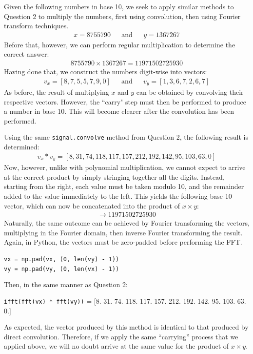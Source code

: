 \documentclass[a4paper, 11pt]{article}
\begin{document}
Given the following numbers in base 10, we seek to apply similar methods to
Question 2 to multiply the numbers, first using convolution, then using Fourier
transform techniques.
\begin{align*}
    x = 8755790 && \text{and} && y = 1367267
\end{align*}
Before that, however, we can perform regular multiplication to determine the
correct answer:
\begin{align*}
    8755790 \times 1367267 = 11971502725930
\end{align*}
Having done that, we construct the numbers digit-wise into vectors:
\begin{align*}
    v_x = [8, 7, 5, 5, 7, 9, 0] && \text{and} && v_y = [1, 3, 6, 7, 2, 6, 7]
\end{align*}
As before, the result of multiplying $x$ and $y$ can be obtained by convolving
their respective vectors. However, the ``carry" step must then be performed to
produce a number in base 10. This will become clearer after the convolution has
been performed.

Using the same \texttt{signal.convolve} method from Question 2, the following
result is determined:
\begin{align*}
    v_x \ast v_y = [8, 31, 74, 118, 117, 157, 212, 192, 142, 95, 103, 63, 0]
\end{align*}
Now, however, unlike with polynomial multiplication, we cannot expect to
arrive at the correct product by simply stringing together all the digits.
Instead, starting from the right, each value must be taken modulo 10, and the
remainder added to the value immediately to the left. This yields the following
base-10 vector, which can now be concatenated into the product of $x \times y$:
\begin{align*}
    [1, 1, 9, 7, 1, 5, 0, 2, 7, 2, 5, 9, 3, 0] \longrightarrow 11971502725930
\end{align*}
Naturally, the same outcome can be achieved by Fourier transforming the vectors,
multiplying in the Fourier domain, then inverse Fourier transforming the result.
Again, in Python, the vectors must be zero-padded before performing the FFT.
\begin{center}
    \texttt{vx = np.pad(vx, (0, len(vy) - 1))} \\
    \texttt{vy = np.pad(vy, (0, len(vx) - 1))}
\end{center}
Then, in the same manner as Question 2:
\begin{center}
    \texttt{ifft(fft(vx) * fft(vy))} =
        [8.  31.  74. 118. 117. 157. 212. 192. 142.  95. 103.  63.   0.]
\end{center}
As expected, the vector produced by this method is identical to that produced by
direct convolution. Therefore, if we apply the same ``carrying'' process that we
applied above, we will no doubt arrive at the same value for the product of
$x\times y$.
\end{document}
